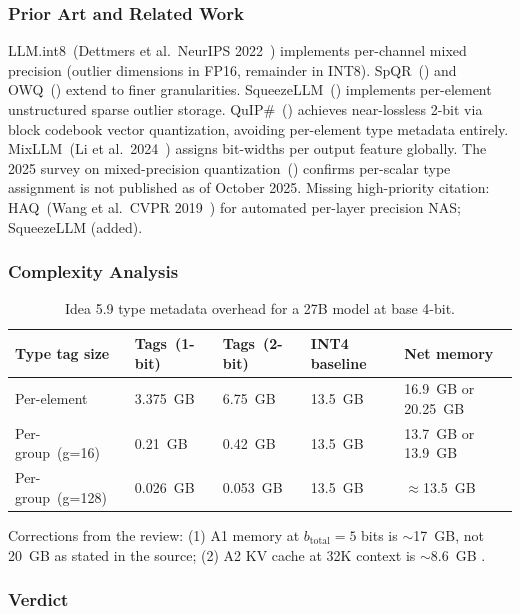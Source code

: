 \documentclass[11pt]{article}
\begin{document}
\subsubsection*{Prior Art and Related Work}

LLM.int8~(Dettmers et al.\ NeurIPS 2022~\cite{DettmersLLMint8}) implements per-channel mixed precision (outlier dimensions in FP16, remainder in INT8). SpQR~(\cite{DettmersSpQR2024}) and OWQ~(\cite{LeeOWQ2024}) extend to finer granularities. SqueezeLLM~(\cite{KimSqueezeLLM2023}) implements per-element unstructured sparse outlier storage. QuIP\#~(\cite{Tseng2024QuIPsharp}) achieves near-lossless 2-bit via block codebook vector quantization, avoiding per-element type metadata entirely. MixLLM~(Li et al.\ 2024~\cite{LiMixLLM2024}) assigns bit-widths per output feature globally. The 2025 survey on mixed-precision quantization~(\cite{MPSurvey2025}) confirms per-scalar type assignment is not published as of October 2025. Missing high-priority citation: HAQ~(Wang et al.\ CVPR 2019~\cite{WangHAQ2019}) for automated per-layer precision NAS; SqueezeLLM (added).

\subsubsection*{Complexity Analysis}

\begin{table}[h]
\centering
\caption{Idea 5.9 type metadata overhead for a 27B model at base 4-bit.}
\small
\begin{tabular}{lllll}
\toprule
Type tag size & Tags~(1-bit) & Tags~(2-bit) & INT4 baseline & Net memory \\
\midrule
Per-element & 3.375~GB & 6.75~GB & 13.5~GB & 16.9~GB or 20.25~GB \\
Per-group~(g=16) & 0.21~GB & 0.42~GB & 13.5~GB & 13.7~GB or 13.9~GB \\
Per-group~(g=128) & 0.026~GB & 0.053~GB & 13.5~GB & $\approx$13.5~GB \\
\bottomrule
\end{tabular}
\end{table}

Corrections from the review: (1) A1 memory at $b_{\text{total}}{=}5$ bits is $\sim$17~GB, not 20~GB as stated in the source; (2) A2 KV cache at 32K context is $\sim$8.6~GB .

\subsubsection*{Verdict}
\end{document}
